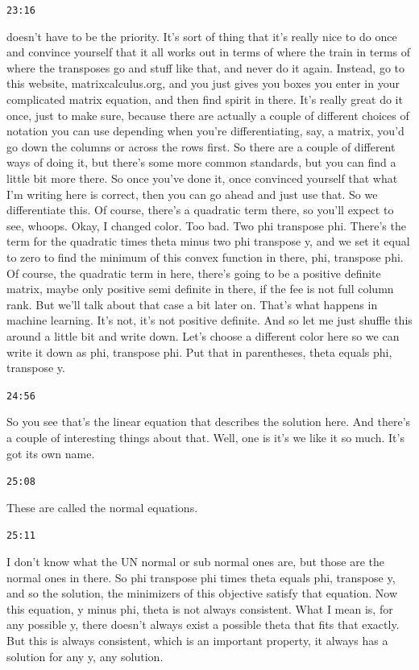 \documentclass[11pt,a4paper]{article}
\newcommand{\timestamp}[1]{%
  \par\vspace{0.35em}%
  \noindent\colorbox{timestampback}{\textcolor{timestampblue}{\small\texttt{#1}}}%
  \par\vspace{0.2em}%
}
\begin{document}
\timestamp{23:16}

doesn't have to be the priority. It's sort of thing that it's really nice to do once and convince yourself that it all works out in terms of where the train in terms of where the transposes go and stuff like that, and never do it again. Instead, go to this website, matrixcalculus.org, and you just gives you boxes you enter in your complicated matrix equation, and then find spirit in there. It's really great do it once, just to make sure, because there are actually a couple of different choices of notation you can use depending when you're differentiating, say, a matrix, you'd go down the columns or across the rows first. So there are a couple of different ways of doing it, but there's some more common standards, but you can find a little bit more there. So once you've done it, once convinced yourself that what I'm writing here is correct, then you can go ahead and just use that. So we differentiate this. Of course, there's a quadratic term there, so you'll expect to see, whoops. Okay, I changed color. Too bad. Two phi transpose phi. There's the term for the quadratic times theta minus two phi transpose y, and we set it equal to zero to find the minimum of this convex function in there, phi, transpose phi. Of course, the quadratic term in here, there's going to be a positive definite matrix, maybe only positive semi definite in there, if the fee is not full column rank. But we'll talk about that case a bit later on. That's what happens in machine learning. It's not, it's not positive definite. And so let me just shuffle this around a little bit and write down. Let's choose a different color here so we can write it down as phi, transpose phi. Put that in parentheses, theta equals phi, transpose y.



\timestamp{24:56}

So you see that's the linear equation that describes the solution here. And there's a couple of interesting things about that. Well, one is it's we like it so much. It's got its own name.



\timestamp{25:08}

These are called the normal equations.



\timestamp{25:11}

I don't know what the UN normal or sub normal ones are, but those are the normal ones in there. So phi transpose phi times theta equals phi, transpose y, and so the solution, the minimizers of this objective satisfy that equation. Now this equation, y minus phi, theta is not always consistent. What I mean is, for any possible y, there doesn't always exist a possible theta that fits that exactly. But this is always consistent, which is an important property, it always has a solution for any y, any solution.
\end{document}
